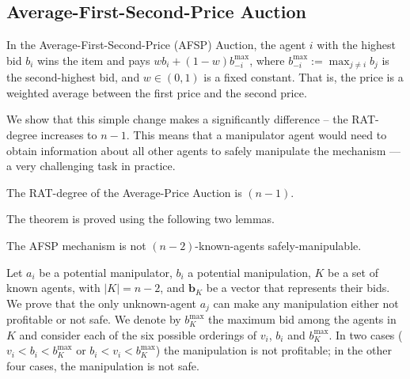 \subsection{Average-First-Second-Price Auction} 
In the Average-First-Second-Price (AFSP) Auction, the agent $i$ with the highest bid $b_i$ wins the item and pays $w b_i + (1-w) b^{\max}_{-i}$, where $\displaystyle b^{\max}_{-i} := \max_{j\neq i} b_j$ is the second-highest bid, and $w\in(0,1)$ is a fixed constant. That is, the price is a weighted average between the first price and the second price.


We show that this simple change makes a significantly difference -- the RAT-degree increases to $n-1$. 
This means that a manipulator agent would need to obtain information about all other agents to safely manipulate the mechanism --- a very challenging task in practice.

\begin{theorem}
\label{auction-average-price}
The RAT-degree of the Average-Price Auction is $(n-1)$.
\end{theorem}
The theorem is proved using the following two lemmas.

\begin{lemmarep}
The AFSP mechanism is not $(n-2)$-known-agents safely-manipulable.
\end{lemmarep}

\begin{proofsketch}
Let $a_i$ be a potential manipulator, $b_i$ a potential manipulation, $K$ be a set of known agents, with $|K| = n-2$, and $\mathbf{b}_{K}$ be a vector that represents their bids.
We prove that the only unknown-agent $a_j$ can make any manipulation either not profitable or not safe.
We denote by $b^{\max}_{K}$ the maximum bid among the agents in $K$ and consider each of the six possible orderings of $v_i$, $b_i$ and $b^{\max}_{K}$.
In two cases ($v_i < b_i < b^{\max}_{K}$ or $b_i < v_i < b^{\max}_{K}$) the manipulation is not profitable;
in the other four cases, the manipulation is not safe.
\end{proofsketch}


